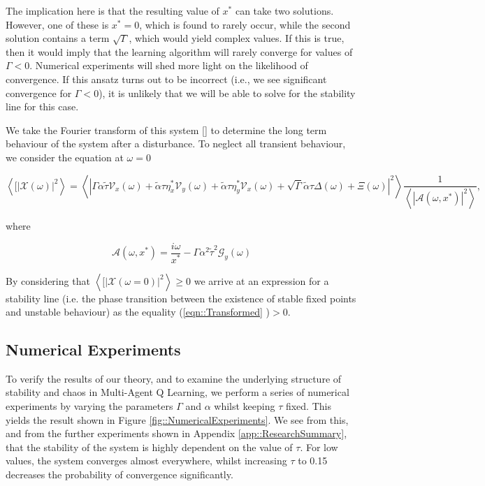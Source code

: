 \documentclass[.../main.tex]{subfiles}
\begin{document}
    The implication here is that the resulting value of $x^*$ can take two solutions. However, one of these is $x^* = 0$, which is found to rarely occur, while the second solution contains a term $\sqrt{\Gamma}$, which would yield complex values. If this is true, then it would imply that the learning algorithm will rarely converge for values of $\Gamma < 0$. Numerical experiments will shed more light on the likelihood of convergence. If this ansatz turns out to be incorrect (i.e., we see significant convergence for $\Gamma < 0$), it is unlikely that we will be able to solve for the stability line for this case.  

    We take the Fourier transform of this system \ref{} to determine the long term behaviour of the system
    after a disturbance. To neglect all transient behaviour, we consider the equation at $\omega =
    0$ 

    \begin{equation} \label{eqn::Transformed}
    \left<[|\mathcal{X}(\omega)|^2 \right> = \left< | \Gamma \alpha \tilde{\tau} \mathcal{V}_x(\omega) + \tilde{\alpha} \tau \eta^*_x \mathcal{V}_y(\omega) + \tilde{\alpha} \tau \eta^*_y \mathcal{V}_x(\omega) + \sqrt{\Gamma} \tilde{\alpha} \tau \Delta(\omega) + \Xi(\omega) |^2 \right> \frac{1}{\left< |\mathcal{A}(\omega, x^*) |^2 \right>}, 
    \end{equation}


    where

    \begin{equation}
        \mathcal{A}(\omega, x^*) = \frac{i \omega}{x^*} - \Gamma \alpha^2 \tilde{\tau}^2 \mathcal{G}_y(\omega)
    \end{equation}

    By
    considering that $\left<[|\mathcal{X}(\omega =
    0)|^2
    \right> \geq 0$  we arrive at an expression for a stability line (i.e. the phase transition
    between the
    existence of stable fixed points and unstable behaviour) as the equality (\ref{eqn::Transformed}
    )$>0$.


    \subsection{Numerical Experiments} %
    \label{sub:numerical_experiments}
    
    To verify the results of our theory, and to examine the underlying structure of stability and
    chaos in Multi-Agent Q Learning, we perform a series of numerical experiments by varying the
    parameters $\Gamma$ and $\alpha$ whilst keeping $\tau$ fixed. This yields the result shown in
    Figure \ref{fig::NumericalExperiments}. We see from this, and from the further experiments shown
    in Appendix \ref{app::ResearchSummary}, that the stability of the system is highly dependent on
    the value of $\tau$.
    For
    low values, the system converges almost everywhere, whilst increasing $\tau$ to 0.15 decreases
    the probability of convergence significantly.
\end{document}

